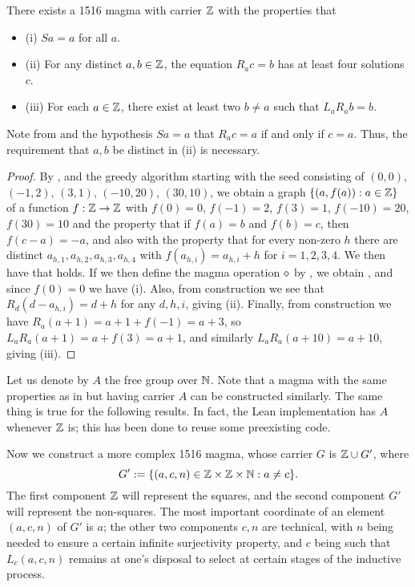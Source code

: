 \begin{corollary}\label{1516-base} There exists a 1516 magma with carrier $\mathbb{Z}$ with the properties that
  \begin{itemize}
    \item (i) $Sa=a$ for all $a$.
    \item (ii) For any distinct $a,b \in \mathbb{Z}$, the equation $R_a c = b$ has at least four solutions $c$.
    \item (iii) For each $a \in \mathbb{Z}$, there exist at least two $b \neq a$ such that $L_a R_a b = b$.
  \end{itemize}
\end{corollary}


Note from  and the hypothesis $Sa=a$ that $R_a c = a$ if and only if $c=a$.  Thus, the requirement that $a,b$ be distinct in (ii) is necessary.

\begin{proof}  By ,  and the greedy algorithm starting with the seed consisting of $(0,0)$, $(-1,2)$, $(3,1)$, $(-10,20)$, $(30,10)$, we obtain a graph $\{ (a,f(a)): a \in \mathbb{Z} \}$ of a function $f:\mathbb{Z} \to \mathbb{Z}$ with $f(0)=0$, $f(-1)=2$, $f(3)=1$, $f(-10) = 20$, $f(30)=10$ and the property that if $f(a)=b$ and $f(b)=c$, then $f(c-a)=-a$, and also with the property that for every non-zero $h$ there are distinct $a_{h,1}, a_{h,2}, a_{h,3}, a_{h,4}$ with $f(a_{h,i})=a_{h,i}+h$ for $i=1, 2, 3, 4$.
We then have that  holds.  If we then define the magma operation $\diamond$ by , we obtain , and since $f(0)=0$ we have (i).  Also, from construction we see that $R_d (d - a_{h,i}) = d+h$ for any $d,h,i$, giving (ii).  Finally, from construction we have $R_a (a+1) = a+1+f(-1) = a+3$, so $L_a R_a (a+1) = a + f(3) = a+1$, and similarly $L_a R_a (a+10) = a+10$, giving (iii).
\end{proof}

Let us denote by $A$ the free group over $\mathbb{N}$. Note that a magma with the same properties as in  but having carrier $A$ can be constructed similarly.
The same thing is true for the following results. In fact, the Lean implementation has $A$ whenever $\mathbb{Z}$ is; this has been done to reuse some preexisting code.

Now we construct a more complex 1516 magma, whose carrier $G$ is $\mathbb{Z} \cup G'$, where
$$G' := \{ (a,c,n) \in \mathbb{Z} \times \mathbb{Z} \times \mathbb{N} : a \neq c\}.$$
The first component $\mathbb{Z}$ will represent the squares, and the second component $G'$ will represent the non-squares.  The most important coordinate of an element $(a,c,n)$ of $G'$ is $a$; the other two components $c,n$ are technical, with $n$ being needed to ensure a certain infinite surjectivity property, and $c$ being such that $L_c (a,c,n)$ remains at one's disposal to select at certain stages of the inductive process.

